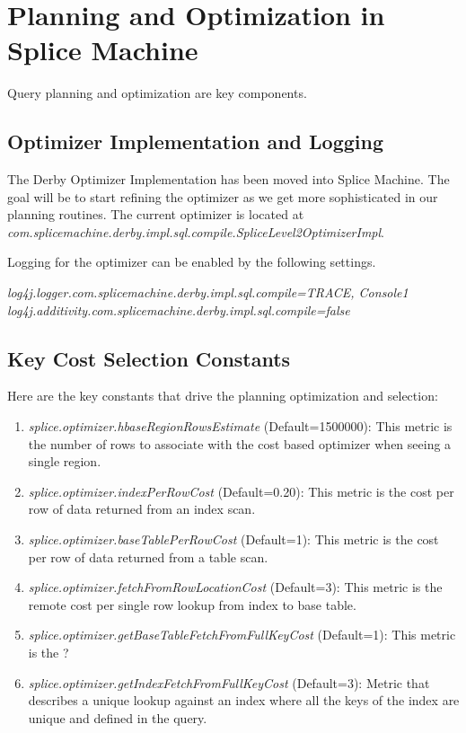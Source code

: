\section{Planning and Optimization in Splice Machine}
Query planning and optimization are key components.

\subsection{Optimizer Implementation and Logging}

The Derby Optimizer Implementation has been moved into Splice Machine.  The goal
will be to start refining the optimizer as we get more sophisticated in our
planning routines.  The current optimizer is located at 
\emph{com.splicemachine.derby.impl.sql.compile.SpliceLevel2OptimizerImpl}.

Logging for the optimizer can be enabled by the following settings.

\emph{log4j.logger.com.splicemachine.derby.impl.sql.compile=TRACE, Console1}
\emph{log4j.additivity.com.splicemachine.derby.impl.sql.compile=false}

\subsection{Key Cost Selection Constants}

Here are the key constants that drive the planning optimization and selection:

\begin{enumerate}
	\item \emph{splice.optimizer.hbaseRegionRowsEstimate} (Default=1500000): This
	metric is the number of rows to associate with the cost based optimizer when seeing a single
	region.  
	\item \emph{splice.optimizer.indexPerRowCost} (Default=0.20): This
	metric is the cost per row of data returned from an index scan. 
	\item \emph{splice.optimizer.baseTablePerRowCost} (Default=1): This
	metric is the cost per row of data returned from a table scan. 
	\item \emph{splice.optimizer.fetchFromRowLocationCost} (Default=3): This
	metric is the remote cost per single row lookup from index to base table.
	\item \emph{splice.optimizer.getBaseTableFetchFromFullKeyCost} (Default=1):
	This metric is the ?
	\item \emph{splice.optimizer.getIndexFetchFromFullKeyCost} (Default=3): Metric
	that describes a unique lookup against an index where all the keys of the
	index are unique and defined in the query.
\end{enumerate}

